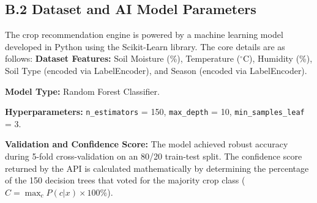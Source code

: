 \subsection*{B.2 Dataset and AI Model Parameters}
The crop recommendation engine is powered by a machine learning model developed in Python using the Scikit-Learn library. The core details are as follows:
\textbf{Dataset Features:} Soil Moisture (\%), Temperature ($^\circ$C), Humidity (\%), Soil Type (encoded via LabelEncoder), and Season (encoded via LabelEncoder).

\textbf{Model Type:} Random Forest Classifier.

\textbf{Hyperparameters:} \texttt{n\_estimators} = 150, \texttt{max\_depth} = 10, \texttt{min\_samples\_leaf} = 3.

\textbf{Validation and Confidence Score:} The model achieved robust accuracy during 5-fold cross-validation on an 80/20 train-test split. The confidence score returned by the API is calculated mathematically by determining the percentage of the 150 decision trees that voted for the majority crop class ($C = \max_c P(c|x) \times 100\%$).

